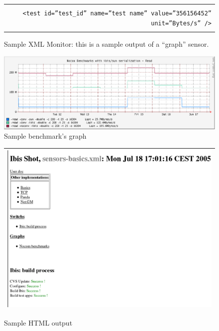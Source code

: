 \documentclass[a4paper,10pt]{article}
\renewcommand{\|}{\url|}
\begin{document}
\begin{figure}[ht]
  \begin{center}
    \begin{tabular}{|r|} \hline
      \\
      \texttt{<test id=''test\_id'' name=''test name'' value=''356156452'' unit=''Bytes/s'' />}\\
      \\
      \hline
    \end{tabular}
  \end{center}
  \caption{Sample XML Monitor: this is a sample output of a ``graph'' sensor.}
  \label{fig:xml_monitor}
\end{figure}


\begin{figure}
  \centering
  \includegraphics[width=\textwidth]{graph}
  \caption{Sample benchmark's graph}
  \label{fig:graph}
\end{figure}

\begin{figure}
  \begin{center}
    \begin{tabular}{|c|} \hline
      \includegraphics[width=\textwidth]{html}\\
      \hline
    \end{tabular}
  \end{center}
  \caption{Sample HTML output}
  \label{fig:html}
\end{figure}
\end{document}
